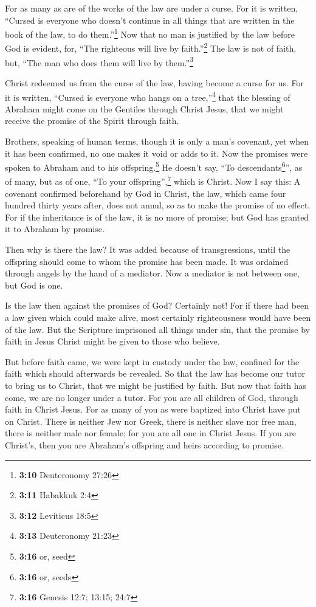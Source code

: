  For as many as are of the works of the law are under a
curse. For it is written, ``Cursed is everyone who doesn't continue in
all things that are written in the book of the law, to do
them.''\footnote{\textbf{3:10} Deuteronomy 27:26}  Now
that no man is justified by the law before God is evident, for, ``The
righteous will live by faith.''\footnote{\textbf{3:11} Habakkuk 2:4}
 The law is not of faith, but, ``The man who does them
will live by them.''\footnote{\textbf{3:12} Leviticus 18:5}

 Christ redeemed us from the curse of the law, having
become a curse for us. For it is written, ``Cursed is everyone who hangs
on a tree,''\footnote{\textbf{3:13} Deuteronomy 21:23} 
that the blessing of Abraham might come on the Gentiles through Christ
Jesus, that we might receive the promise of the Spirit through faith.

 Brothers, speaking of human terms, though it is only a
man's covenant, yet when it has been confirmed, no one makes it void or
adds to it.  Now the promises were spoken to Abraham and
to his offspring.\footnote{\textbf{3:16} or, seed} He doesn't say, ``To
descendants\footnote{\textbf{3:16} or, seeds}'', as of many, but as of
one, ``To your offspring'',\footnote{\textbf{3:16} Genesis 12:7; 13:15;
  24:7} which is Christ.  Now I say this: A covenant
confirmed beforehand by God in Christ, the law, which came four hundred
thirty years after, does not annul, so as to make the promise of no
effect.  For if the inheritance is of the law, it is no
more of promise; but God has granted it to Abraham by promise.

 Then why is there the law? It was added because of
transgressions, until the offspring should come to whom the promise has
been made. It was ordained through angels by the hand of a mediator.
 Now a mediator is not between one, but God is one.

 Is the law then against the promises of God? Certainly
not! For if there had been a law given which could make alive, most
certainly righteousness would have been of the law.  But
the Scripture imprisoned all things under sin, that the promise by faith
in Jesus Christ might be given to those who believe.

 But before faith came, we were kept in custody under the
law, confined for the faith which should afterwards be revealed.
 So that the law has become our tutor to bring us to
Christ, that we might be justified by faith.  But now
that faith has come, we are no longer under a tutor.  For
you are all children of God, through faith in Christ Jesus.
 For as many of you as were baptized into Christ have put
on Christ.  There is neither Jew nor Greek, there is
neither slave nor free man, there is neither male nor female; for you
are all one in Christ Jesus.  If you are Christ's, then
you are Abraham's offspring and heirs according to promise.

